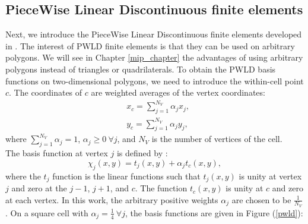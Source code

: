 \subsection{PieceWise Linear Discontinuous finite elements}
Next, we introduce the PieceWise Linear Discontinuous finite
elements developed in \cite{pwld_3d,pwld_2d}. The interest of PWLD finite
elements is that they can be used on arbitrary polygons. We will see in
Chapter \ref{mip_chapter} the advantages of using arbitrary polygons instead
of triangles or quadrilaterals. To obtain the PWLD basis
functions on two-dimensional polygons, we need to introduce the within-cell
point $c$. The coordinates of $c$ are weighted averages of the vertex coordinates:
\begin{align}
& x_c = \sum_{j=1}^{N_V} \alpha_{j} x_j,\\
& y_c = \sum_{j=1}^{N_V} \alpha_{j} y_j,
\end{align}
where $\sum_{j=1}^{N_V} \alpha_{j}=1$, $\alpha_j \geq 0\ \forall j$, and $N_V$ is 
the number of vertices of the cell.\\
The basis function at vertex $j$ is defined by \cite{pwld_2d}:
\begin{equation}
\chi_{j} (x,y) = t_{j}(x,y) + \alpha_j t_c(x,y),
\end{equation}
where the $t_j$ function is the linear functions such that $t_j (x,y)$ is
unity at vertex $j$ and zero at the  $j-1$, $j+1$, and $c$. The function 
$t_c(x,y)$ is unity at $c$ and zero at each vertex. In this work, the arbitrary 
positive weights $\alpha_j$ are chosen to be $\frac{1}{N_V}$. On a square cell with 
$\alpha_{j}=\frac{1}{4}\ \forall j$, the basis functions are given in Figure 
(\ref{pwld}):
